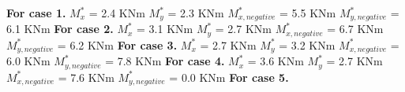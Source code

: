 \documentclass{article}%
\begin{document}
%
\textbf{For case 1.\newline%
\newline%
}%
$M_{x}^{*}$ = 2.4 KNm%
\newline%
\newline%
%
$M_{y}^{*}$ = 2.3 KNm%
\newline%
\newline%
%
$M_{x,negative}^{*}$ = 5.5 KNm%
\newline%
\newline%
%
$M_{y,negative}^{*}$ = 6.1 KNm%
\newline%
\newline%
%
\textbf{For case 2.\newline%
\newline%
}%
$M_{x}^{*}$ = 3.1 KNm%
\newline%
\newline%
%
$M_{y}^{*}$ = 2.7 KNm%
\newline%
\newline%
%
$M_{x,negative}^{*}$ = 6.7 KNm%
\newline%
\newline%
%
$M_{y,negative}^{*}$ = 6.2 KNm%
\newline%
\newline%
%
\textbf{For case 3.\newline%
\newline%
}%
$M_{x}^{*}$ = 2.7 KNm%
\newline%
\newline%
%
$M_{y}^{*}$ = 3.2 KNm%
\newline%
\newline%
%
$M_{x,negative}^{*}$ = 6.0 KNm%
\newline%
\newline%
%
$M_{y,negative}^{*}$ = 7.8 KNm%
\newline%
\newline%
%
\textbf{For case 4.\newline%
\newline%
}%
$M_{x}^{*}$ = 3.6 KNm%
\newline%
\newline%
%
$M_{y}^{*}$ = 2.7 KNm%
\newline%
\newline%
%
$M_{x,negative}^{*}$ = 7.6 KNm%
\newline%
\newline%
%
$M_{y,negative}^{*}$ = 0.0 KNm%
\newline%
\newline%
%
\textbf{For case 5.\newline%
\newline%
}%
\end{document}
